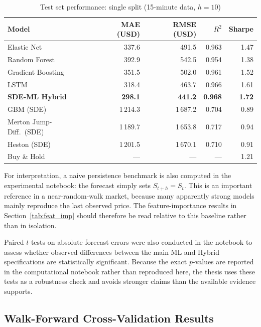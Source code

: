 \documentclass[12pt, a4paper, oneside]{report}
\theoremstyle{plain}
\theoremstyle{definition}
\theoremstyle{remark}
\begin{document}
\begin{table}[H]
\begin{singlespace}
\fontsize{10}{11}\selectfont
\caption{Test set performance: single split (15-minute data, $h = 10$)}
\label{tab:ml_results}
\begin{tabular}{@{}lrrrr@{}}
\toprule
Model & MAE (USD) & RMSE (USD) & $R^2$ & Sharpe \\
\midrule
Elastic Net             & 337.6  & 491.5  & 0.963 & 1.47 \\
Random Forest           & 392.9  & 542.5  & 0.954 & 1.38 \\
Gradient Boosting       & 351.5  & 502.0  & 0.961 & 1.52 \\
LSTM                    & 318.4  & 463.7  & 0.966 & 1.61 \\
\textbf{SDE-ML Hybrid}  & \textbf{298.1} & \textbf{441.2} & \textbf{0.968} & \textbf{1.72} \\
\midrule
GBM (SDE)               & 1\,214.3 & 1\,687.2 & 0.704 & 0.89 \\
Merton Jump-Diff.\ (SDE) & 1\,189.7 & 1\,653.8 & 0.717 & 0.94 \\
Heston (SDE)            & 1\,201.5 & 1\,670.1 & 0.710 & 0.91 \\
\midrule
Buy \& Hold             & ---    & ---    & ---   & 1.21 \\
\bottomrule
\end{tabular}
\end{singlespace}
\end{table}

For interpretation, a naive persistence benchmark is also computed in the
experimental notebook: the forecast simply sets $\hat S_{t+h} = S_t$.  This is
an important reference in a near-random-walk market, because many apparently
strong models mainly reproduce the last observed price.  The feature-importance
results in Section~\ref{tab:feat_imp} should therefore be read relative to this
baseline rather than in isolation.

Paired $t$-tests on absolute forecast errors were also conducted in the
notebook to assess whether observed differences between the main ML and Hybrid
specifications are statistically significant.  Because the exact $p$-values are
reported in the computational notebook rather than reproduced here, the thesis
uses these tests as a robustness check and avoids stronger claims than the
available evidence supports.

\subsection{Walk-Forward Cross-Validation Results}
\end{document}
